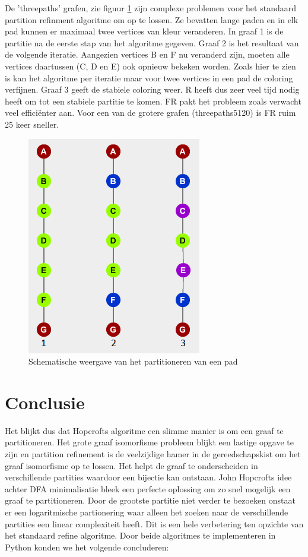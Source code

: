 \documentclass[twoside]{article}
\begin{document}
\begin{multicols}{2}
De 'threepaths' grafen, zie figuur \ref{paths} zijn complexe problemen voor het standaard partition refinment algoritme om op te lossen. Ze bevatten lange paden en in elk pad kunnen er maximaal twee vertices van kleur veranderen. In graaf 1 is de partitie na de eerste stap van het algoritme gegeven. Graaf 2 is het resultaat van de volgende iteratie. Aangezien vertices B en F nu veranderd zijn, moeten alle vertices daartussen (C, D en E) ook opnieuw bekeken worden. Zoals hier te zien is kan het algoritme per iteratie maar voor twee vertices in een pad de coloring verfijnen. Graaf 3 geeft de stabiele coloring weer. R heeft dus zeer veel tijd nodig heeft om tot een stabiele partitie te komen. FR pakt het probleem zoals verwacht veel effici\"enter aan. Voor een van de grotere grafen (threepaths5120) is FR ruim 25 keer sneller.

\begin{figure}[H]
\centering
\includegraphics[]{paths.png}
\caption{Schematische weergave van het partitioneren van een pad}
\label{paths}
\end{figure}


\section{Conclusie}
Het blijkt dus dat Hopcrofts algoritme een slimme manier is om een graaf te partitioneren. Het grote graaf isomorfisme probleem blijkt een lastige opgave te zijn en partition refinement is de veelzijdige hamer in de gereedschapskist om het graaf isomorfisme op te lossen. Het helpt de graaf te onderscheiden in verschillende partities waardoor een bijectie kan ontstaan. John Hopcrofts idee achter DFA minimalisatie bleek een perfecte oplossing om zo snel mogelijk een graaf te partitioneren. Door de grootste partitie niet verder te bezoeken onstaat er een logaritmische partionering waar alleen het zoeken naar de verschillende partities een linear complexiteit heeft. Dit is een hele verbetering ten opzichte van het standaard refine algoritme. Door beide algoritmes te implementeren in Python konden we het volgende concluderen:


\end{multicols}
\end{document}
